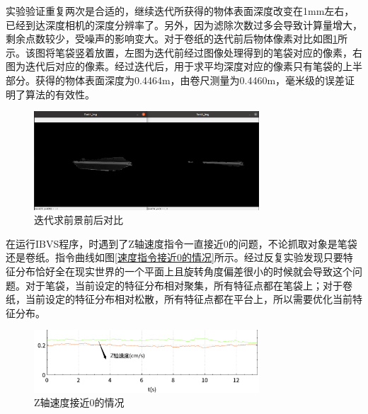 \documentclass[fontset=fandol,type=bachelor,campus=harbin,bsmainpagenumberline=true]{hithesisbook}
\begin{document}
实验验证重复两次是合适的，继续迭代所获得的物体表面深度改变在1mm左右，已经到达深度相机的深度分辨率了。另外，因为滤除次数过多会导致计算量增大，剩余点数较少，受噪声的影响变大。对于卷纸的迭代前后物体像素对比如图\ref{迭代求前景前后对比}所示。该图将笔袋竖着放置，左图为迭代前经过图像处理得到的笔袋对应的像素，右图为迭代后对应的像素。经过迭代后，用于求平均深度对应的像素只有笔袋的上半部分。获得的物体表面深度为0.4464m，由卷尺测量为0.4460m，毫米级的误差证明了算法的有效性。
\begin{figure}[h]
\centering
\includegraphics[width = 0.75\textwidth]{chapter4/迭代求前景前后对比}
\caption{迭代求前景前后对比}
\label{迭代求前景前后对比}
\end{figure}


在运行IBVS程序，时遇到了Z轴速度指令一直接近0的问题，不论抓取对象是笔袋还是卷纸。指令曲线如图\ref{速度指令接近0的情况}所示。经过反复实验发现只要特征分布恰好全在现实世界的一个平面上且旋转角度偏差很小的时候就会导致这个问题。对于笔袋，当前设定的特征分布相对聚集，所有特征点都在笔袋上；对于卷纸，当前设定的特征分布相对松散，所有特征点都在平台上，所以需要优化当前特征分布。\begin{figure}[h]
\centering
\includegraphics[width = 0.75\textwidth]{chapter4/Z轴速度接近0的情况}
\caption{Z轴速度接近0的情况}
\label{Z轴速度接近0的情况}
\end{figure}
\end{document}
